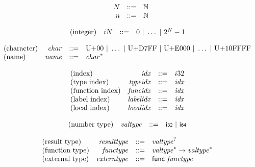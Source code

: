 \documentclass{article}
\begin{document}
$$
\begin{array}{@{}lrrl@{}l@{}}
	& N &::=& \mathbb{N} \\
	& n &::=& \mathbb{N} \\
\end{array}
$$

\vspace{1ex}

$$
\begin{array}{@{}lrrl@{}l@{}}
	\mbox{(integer)} & {i}{N} &::=& 0 ~|~ \dots ~|~ {2^{N}} - 1 \\
\end{array}
$$

\vspace{1ex}

$$
\begin{array}{@{}lrrl@{}l@{}}
	\mbox{(character)} & {\mathit{char}} &::=& \mathrm{U{+}00} ~|~ \dots ~|~ \mathrm{U{+}D7FF} ~|~ \mathrm{U{+}E000} ~|~ \dots ~|~ \mathrm{U{+}10FFFF} \\
	\mbox{(name)} & {\mathit{name}} &::=& {{\mathit{char}}^\ast} \\
\end{array}
$$

\vspace{1ex}

$$
\begin{array}{@{}lrrl@{}l@{}}
	\mbox{(index)} & {\mathit{idx}} &::=& {i}{32} \\
	\mbox{(type index)} & {\mathit{typeidx}} &::=& {\mathit{idx}} \\
	\mbox{(function index)} & {\mathit{funcidx}} &::=& {\mathit{idx}} \\
	\mbox{(label index)} & {\mathit{labelidx}} &::=& {\mathit{idx}} \\
	\mbox{(local index)} & {\mathit{localidx}} &::=& {\mathit{idx}} \\
\end{array}
$$

\vspace{1ex}

$$
\begin{array}{@{}lrrl@{}l@{}}
	\mbox{(number type)} & {\mathit{valtype}} &::=& \mathsf{i{\scriptstyle 32}} ~|~ \mathsf{i{\scriptstyle 64}} \\
\end{array}
$$

$$
\begin{array}{@{}lrrl@{}l@{}}
	\mbox{(result type)} & {\mathit{resulttype}} &::=& {{\mathit{valtype}}^?} \\
	\mbox{(function type)} & {\mathit{functype}} &::=& {{\mathit{valtype}}^\ast} \rightarrow {{\mathit{valtype}}^\ast} \\
	\mbox{(external type)} & {\mathit{externtype}} &::=& \mathsf{func}~{\mathit{functype}} \\
\end{array}
$$
\end{document}
